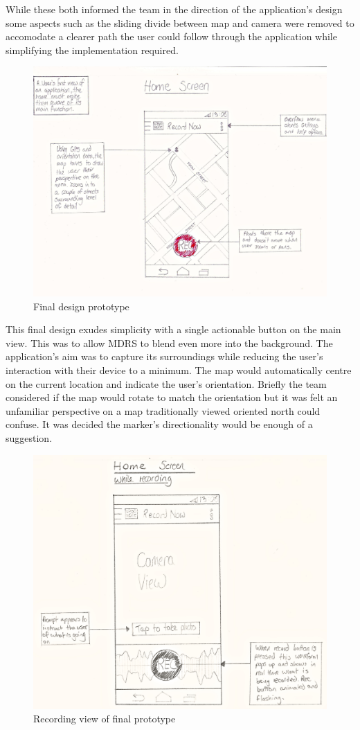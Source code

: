 \documentclass{l3proj}
\begin{document}
While these both informed the team in the direction of the application's design some aspects such as the sliding divide between map and camera were removed to accomodate a clearer path the user could follow through the application while simplifying the implementation required.

\begin{figure}[ht!]
\centering
\includegraphics[width=.85\textwidth]{images/android-home-view.jpg}
\caption{Final design prototype}
\end{figure}

This final design exudes simplicity with a single actionable button on the main view. This was to allow MDRS to blend even more into the background. The application's aim was to capture its surroundings while reducing the user's interaction with their device to a minimum. The map would automatically centre on the current location and indicate the user's orientation. Briefly the team considered if the map would rotate to match the orientation but it was felt an unfamiliar perspective on a map traditionally viewed oriented north could confuse. It was decided the marker's directionality would be enough of a suggestion.

\begin{figure}[ht!]
\centering
\includegraphics[width=.85\textwidth]{images/android-recording-view.jpg}
\caption{Recording view of final prototype}
\end{figure}
\end{document}
